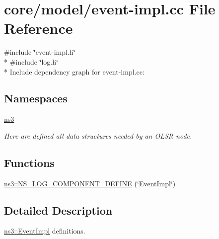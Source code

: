\hypertarget{event-impl_8cc}{}\section{core/model/event-\/impl.cc File Reference}
\label{event-impl_8cc}
{\ttfamily \#include \char`\"{}event-\/impl.\+h\char`\"{}}\\*
{\ttfamily \#include \char`\"{}log.\+h\char`\"{}}\\*
Include dependency graph for event-\/impl.cc\+:
\subsection*{Namespaces}
\begin{DoxyCompactItemize}
\item 
 \hyperlink{namespacens3}{ns3}
\begin{DoxyCompactList}\small\item\em Here are defined all data structures needed by an O\+L\+SR node. \end{DoxyCompactList}\end{DoxyCompactItemize}
\subsection*{Functions}
\begin{DoxyCompactItemize}
\item 
\hyperlink{namespacens3_a1c7d17f47cf85971194feb31e6554633}{ns3\+::\+N\+S\+\_\+\+L\+O\+G\+\_\+\+C\+O\+M\+P\+O\+N\+E\+N\+T\+\_\+\+D\+E\+F\+I\+NE} (\char`\"{}Event\+Impl\char`\"{})
\end{DoxyCompactItemize}


\subsection{Detailed Description}
\hyperlink{classns3_1_1EventImpl}{ns3\+::\+Event\+Impl} definitions. 